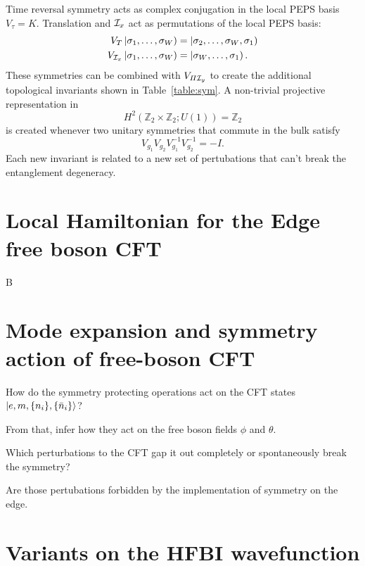 Time reversal symmetry acts as complex conjugation in the local PEPS basis $V_{\tau}=K$.
Translation and $\mathcal{I}_x$ act as permutations of the local PEPS basis:
\begin{equation*}
\begin{split}
V_{T}\left |\sigma_1, \ldots, \sigma_{W} \right ) &= \left |\sigma_2, \ldots, \sigma_{W}, \sigma_{1} \right ) \\
V_{\mathcal{I}_x}\left |\sigma_1, \ldots, \sigma_{W} \right ) &= \left |\sigma_W, \ldots, \sigma_{1} \right ).
\end{split}
\end{equation*}
These symmetries can be combined with $V_{\varPi \mathcal{I}_y}$ to create the additional topological 
invariants shown in Table~\ref{table:sym}. A non-trivial projective 
representation in $$H^2(\mathbb{Z}_2 \times \mathbb{Z}_2; U(1)) = \mathbb{Z}_2$$
is created whenever two unitary symmetries that commute in the bulk satisfy 
$$V_{g_1} V_{g_2} V_{g_1}^{-1} V_{g_2}^{-1} = -I.$$
Each new invariant is related to a new set of pertubations that can't break the entanglement 
degeneracy. 

\section{Local Hamiltonian for the Edge free boson CFT}
\label{Appendix:LocalEdge}

B

\section{Mode expansion and symmetry action of free-boson CFT}
\label{Appendix:CFT}
How do the symmetry protecting operations act on the CFT states
$\vert e, m, \{n_i\}, \{\bar{n}_i\} \rangle$?

From that, infer how they act on the free boson fields $\phi$ and $\theta$.

Which perturbations to the CFT gap it out completely or spontaneously break the symmetry?

Are those pertubations forbidden by the implementation of symmetry on the edge.

\section{Variants on the HFBI wavefunction}
